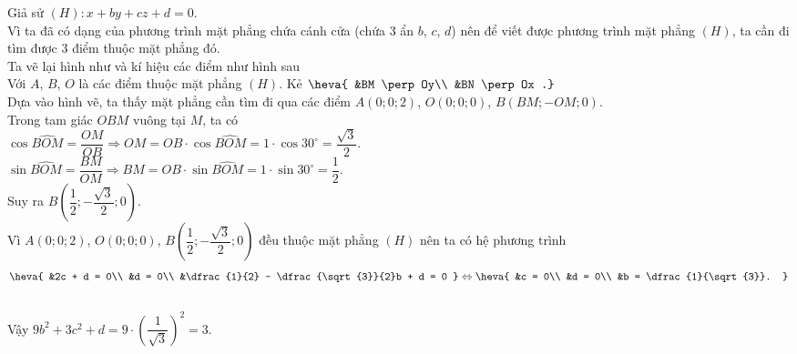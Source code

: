 \begin{bt}
{		\noindent 
		Giả sử $(H) \colon x + by  + cz + d = 0$.\\
		Vì ta đã có dạng của phương trình mặt phẳng chứa cánh  cửa (chứa 3 ẩn $b$, $c$, $d$) nên để viết được phương trình mặt phẳng $(H)$, ta cần đi tìm được 3 điểm thuộc mặt phẳng đó.\\
		Ta  vẽ lại hình như và kí hiệu các điểm như hình sau\\
		Với $A$, $B$, $O$ là các điểm thuộc  mặt phẳng $(H)$. Kẻ
		$\heva{ 
		 &BM \perp Oy\\
		 &BN \perp Ox
		.}$\\ 
		Dựa vào hình vẽ, ta thấy mặt phẳng  cần tìm đi qua các điểm $A(0;0;2)$, $O(0;0;0)$, $B(BM;-OM;0)$.\\
		 Trong tam giác $OBM$ vuông tại $M$, ta có\\
		$\cos{\widehat{BOM}}  = \dfrac{OM}{OB} \Rightarrow OM = OB \cdot \cos{\widehat{BOM}} = 1 \cdot \cos{30^{\circ}} = \dfrac{\sqrt{3}}{2}$.\\
		$\sin{\widehat{BOM}} = \dfrac{BM}{OM} \Rightarrow BM =  OB\cdot \sin{\widehat{BOM}} = 1 \cdot \sin{30^{\circ}} = \dfrac{1}{2}$.\\
		 Suy ra $B\left(\dfrac{1}{2};-\dfrac{\sqrt{3}}{2};0\right)$.\\
		Vì $A(0;0;2)$, $O(0;0;0)$, $B\left(\dfrac{1}{2};-\dfrac{\sqrt{3}}{2};0\right)$ đều thuộc  mặt phẳng $(H)$ nên ta có hệ phương trình
		$$\heva{ 
		 &2c + d = 0\\
		&d  = 0\\
		&\dfrac{1}{2} - \dfrac{\sqrt{3}}{2}b + d  = 0
		 } \Leftrightarrow
		 \heva{
		 &c = 0\\
		&d  = 0\\
		&b =  \dfrac{1}{\sqrt{3}}.
		 }$$\\
		Vậy $9b^2 + 3c^2 + d = 9 \cdot \left(\dfrac{1}{\sqrt{3}}\right)^2 =  3$.
	} 
\end{bt}

